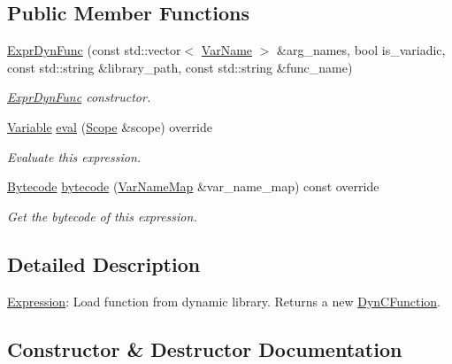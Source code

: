 \subsection*{Public Member Functions}
\begin{DoxyCompactItemize}
\item 
\hyperlink{classcreek_1_1_expr_dyn_func_a714e7378acdf0125f243cccdd3745537}{Expr\+Dyn\+Func} (const std\+::vector$<$ \hyperlink{classcreek_1_1_var_name}{Var\+Name} $>$ \&arg\+\_\+names, bool is\+\_\+variadic, const std\+::string \&library\+\_\+path, const std\+::string \&func\+\_\+name)
\begin{DoxyCompactList}\small\item\em {\ttfamily \hyperlink{classcreek_1_1_expr_dyn_func}{Expr\+Dyn\+Func}} constructor. \end{DoxyCompactList}\item 
\hyperlink{classcreek_1_1_variable}{Variable} \hyperlink{classcreek_1_1_expr_dyn_func_af04443b77329e7a075f02ff9efb08b56}{eval} (\hyperlink{classcreek_1_1_scope}{Scope} \&scope) override
\begin{DoxyCompactList}\small\item\em Evaluate this expression. \end{DoxyCompactList}\item 
\hyperlink{classcreek_1_1_bytecode}{Bytecode} \hyperlink{classcreek_1_1_expr_dyn_func_a3a9e9756fe4a5e1d6d078d1a709b24fa}{bytecode} (\hyperlink{classcreek_1_1_var_name_map}{Var\+Name\+Map} \&var\+\_\+name\+\_\+map) const  override\hypertarget{classcreek_1_1_expr_dyn_func_a3a9e9756fe4a5e1d6d078d1a709b24fa}{}\label{classcreek_1_1_expr_dyn_func_a3a9e9756fe4a5e1d6d078d1a709b24fa}

\begin{DoxyCompactList}\small\item\em Get the bytecode of this expression. \end{DoxyCompactList}\end{DoxyCompactItemize}


\subsection{Detailed Description}
\hyperlink{classcreek_1_1_expression}{Expression}\+: Load function from dynamic library. Returns a new {\ttfamily \hyperlink{classcreek_1_1_dyn_c_function}{Dyn\+C\+Function}}. 

\subsection{Constructor \& Destructor Documentation}
